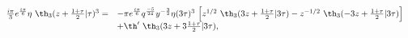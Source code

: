 \begin{equation}
  \begin{array}{rl}
{i\pi \over 3} e^{{i\pi\over 6}} \eta~\th_3(z+{1+\tau\over
    2}|\tau)^3 =& -\pi e^{{i\pi\over 6}} q^{-5\over 24} y^{-{3\over
    2}} \eta(3\tau)^3~ \Big[ z^{1/2}~\th_3(3z+{1+\tau\over 2}|3\tau) -
    z^{-1/2}~\th_3(-3z+{1+\tau\over 2}|3\tau) \Big] \\
  &+ \th' ~\th_3(3z+3{1+\tau\over 2}|3\tau),
  \end{array}
\end{equation}

